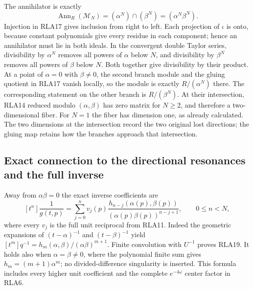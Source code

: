 \documentclass[11pt]{article}
\begin{document}
The annihilator is exactly
\[
 \operatorname{Ann}_R(\mathcal M_N)
       =(\alpha^N)\cap(\beta^N)=(\alpha^N\beta^N).
 \tag{RLA18}
\]
Injection in RLA17 gives inclusion from right to left.
Each projection of $\iota$ is onto, because constant polynomials
give every residue in each component; hence an annihilator must
lie in both ideals.  In the convergent double Taylor series,
divisibility by $\alpha^N$ removes all powers of $\alpha$ below
$N$, and divisibility by $\beta^N$ removes all powers of $\beta$
below $N$.  Both together give divisibility by their product.
At a point of $\alpha=0$ with $\beta\ne0$, the second branch
module and the gluing quotient in RLA17 vanish locally, so the
module is exactly $R/(\alpha^N)$ there.  The corresponding
statement on the other branch is $R/(\beta^N)$.
At their intersection, RLA14 reduced modulo $(\alpha,\beta)$ has
zero matrix for $N\ge2$, and therefore a two-dimensional fiber.
For $N=1$ the fiber has dimension one, as already calculated.
The two dimensions at the intersection record the two original
lost directions; the gluing map retains how the branches approach
that intersection.

\subsection{Exact connection to the directional resonances and the full inverse}

Away from $\alpha\beta=0$ the exact inverse coefficients are
\[
 [t^n]\frac1{g(t,p)}
 =\sum_{j=0}^n v_j(p)
       \frac{h_{n-j}(\alpha(p),\beta(p))}
            {(\alpha(p)\beta(p))^{n-j+1}},\qquad 0\le n<N,
 \tag{RLA19}
\]
where every $v_j$ is the full unit reciprocal from RLA11.
Indeed the geometric expansions of $(t-\alpha)^{-1}$ and
$(t-\beta)^{-1}$ yield
$[t^m]q^{-1}=h_m(\alpha,\beta)/(\alpha\beta)^{m+1}$.
Finite convolution with $U^{-1}$ proves RLA19.  It holds also
when $\alpha=\beta\ne0$, where the polynomial finite sum gives
$h_m=(m+1)\alpha^m$; no divided-difference singularity is inserted.
This formula includes every higher unit coefficient and the complete
$e^{-4\omega}$ center factor in RLA6.
\end{document}
